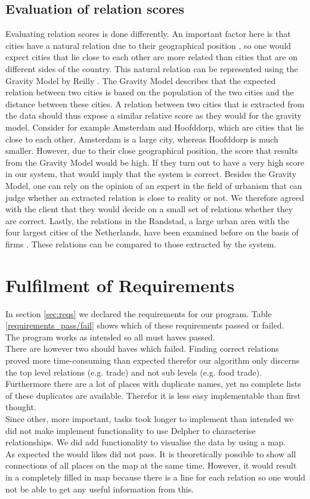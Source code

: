 \subsection{Evaluation of relation scores}
Evaluating relation scores is done differently. An important factor here is that cities have a natural relation due to their geographical position \cite{tobler1970computer}, so one would expect cities that lie close to each other are more related than cities that are on different sides of the country. This natural relation can be represented using the Gravity Model by Reilly \cite{reilly1931law}. The Gravity Model describes that the expected relation between two cities is based on the population of the two cities and the distance between these cities. A relation between two cities that is extracted from the data should thus expose a similar relative score as they would for the gravity model. Consider for example Amsterdam and Hoofddorp, which are cities that lie close to each other. Amsterdam is a large city, whereas Hoofddorp is much smaller. However, due to their close geographical position, the score that results from the Gravity Model would be high. If they turn out to have a very high score in our system, that would imply that the system is correct. Besides the Gravity Model, one can rely on the opinion of an expert in the field of urbanism that can judge whether an extracted relation is close to reality or not. We therefore agreed with the client that they would decide on a small set of relations whether they are correct. Lastly, the relations in the Randstad, a large urban area with the four largest cities of the Netherlands, have been examined before on the basis of firms \cite{van2010economic}. These relations can be compared to those extracted by the system.

\section{Fulfilment of Requirements}
In section \ref{sec:reqs} we declared the requirements for our program. Table \ref{requirements_pass/fail} shows which of these requirements passed or failed. \\
The program works as intended so all must haves passed. \\
There are however two should haves which failed. Finding correct relations proved more time-consuming than expected therefor our algorithm only discerns the top level relations (e.g. trade) and not sub levels (e.g. food trade). Furthermore there are a lot of places with duplicate names, yet no complete lists of these duplicates are available. Therefor it is less easy implementable than first thought. \\
Since other, more important, tasks took longer to implement than intended we did not make implement functionality to use Delpher to characterise relationships. We did add functionality to visualise the data by using a map. \\
As expected the would likes did not pass. It is theoretically possible to show all connections of all places on the map at the same time. However, it would result in a completely filled in map because there is a line for each relation so one would not be able to get any useful information from this.

